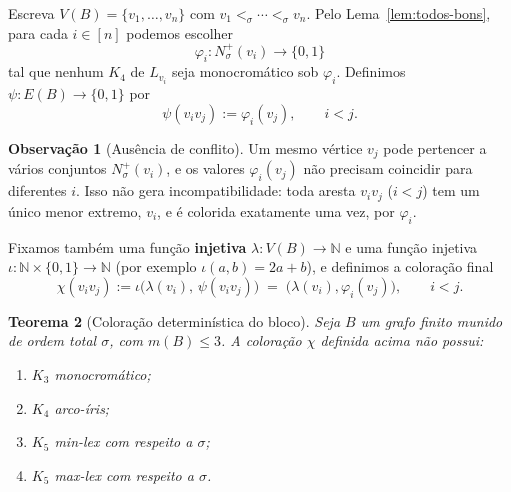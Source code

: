 \documentclass[reqno, 12pt]{amsart}
\numberwithin{equation}{section}
\theoremstyle{plain}
\newtheorem{theorem}{Teorema}[section]
\theoremstyle{definition}
\newtheorem{remark}[theorem]{Observação}
\begin{document}
Escreva $V(B)=\{v_1,\ldots,v_n\}$ com $v_1<_\sigma\cdots<_\sigma v_n$.
Pelo Lema~\ref{lem:todos-bons}, para cada $i\in[n]$ podemos escolher
\[
  \varphi_i:N_\sigma^+(v_i)\longrightarrow\{0,1\}
\]
tal que nenhum $K_4$ de $L_{v_i}$ seja monocromático sob $\varphi_i$.
Definimos $\psi:E(B)\to\{0,1\}$ por
\[
  \psi(v_iv_j):=\varphi_i(v_j),\qquad i<j.
\]

\begin{remark}[Ausência de conflito]
  Um mesmo vértice $v_j$ pode pertencer a vários conjuntos
  $N_\sigma^+(v_i)$, e os valores $\varphi_i(v_j)$ não precisam
  coincidir para diferentes $i$. Isso não gera incompatibilidade:
  toda aresta $v_iv_j$ ($i<j$) tem um único menor extremo, $v_i$, e é
  colorida exatamente uma vez, por $\varphi_i$.
\end{remark}

Fixamos também uma função \textbf{injetiva} $\lambda:V(B)\to\mathbb{N}$
e uma função injetiva $\iota:\mathbb{N}\times\{0,1\}\to\mathbb{N}$
(por exemplo $\iota(a,b)=2a+b$), e definimos a coloração final
\[
  \chi(v_iv_j):=\iota\bigl(\lambda(v_i),\,\psi(v_iv_j)\bigr)
  \;=\;\bigl(\lambda(v_i),\varphi_i(v_j)\bigr),
  \qquad i<j.
\]

\begin{theorem}[Coloração determinística do bloco]
  \label{thm:coloracao-bloco}
  Seja $B$ um grafo finito munido de ordem total $\sigma$, com
  $m(B)\leq 3$. A coloração $\chi$ definida acima não possui:
  \begin{enumerate}
    \item[(i)] $K_3$ monocromático;
    \item[(ii)] $K_4$ arco-íris;
    \item[(iii)] $K_5$ min-lex com respeito a $\sigma$;
    \item[(iv)] $K_5$ max-lex com respeito a $\sigma$.
  \end{enumerate}
\end{theorem}
\end{document}
